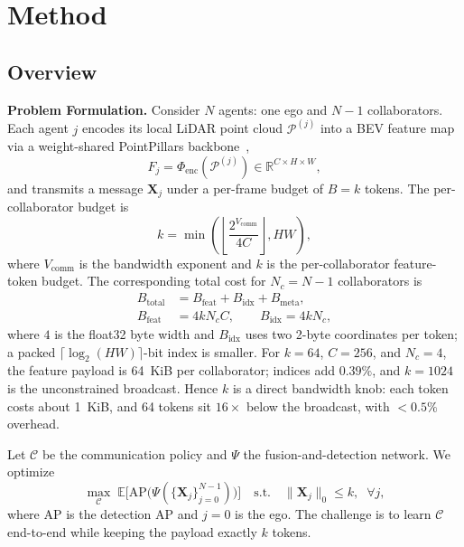 \section{Method}
\label{sec:method}
\subsection{Overview}
\label{subsec:overview}
\noindent\textbf{Problem Formulation.}
Consider $N$ agents: one ego and $N{-}1$ collaborators. Each agent $j$ encodes its local LiDAR point cloud $\mathcal{P}^{(j)}$ into a BEV feature map via a weight-shared PointPillars backbone~\cite{pointpillars},
\begin{equation}
  F_j = \Phi_{\text{enc}}(\mathcal{P}^{(j)}) \in \mathbb{R}^{C\times H\times W},
\end{equation}
and transmits a message $\mathbf{X}_j$ under a per-frame budget of $B{=}k$ tokens. The per-collaborator budget is
\begin{equation}
  k = \min\!\left(\left\lfloor \frac{2^{V_{\text{comm}}}}{4C}\right\rfloor, HW\right),
  \label{eq:budget}
\end{equation}
where $V_{\text{comm}}$ is the bandwidth exponent and $k$ is the per-collaborator feature-token budget. The corresponding total cost for $N_c=N-1$ collaborators is
\begin{equation}
\begin{aligned}
  B_{\text{total}} &= B_{\text{feat}} + B_{\text{idx}} + B_{\text{meta}},\\
  B_{\text{feat}} &= 4 k N_c C,\qquad B_{\text{idx}}=4 k N_c,
\end{aligned}
\label{eq:overhead}
\end{equation}
where $4$ is the float32 byte width and $B_{\text{idx}}$ uses two 2-byte coordinates per token; a packed $\lceil\log_2(HW)\rceil$-bit index is smaller. For $k{=}64$, $C{=}256$, and $N_c{=}4$, the feature payload is 64~KiB per collaborator; indices add $0.39\%$, and $k{=}1024$ is the unconstrained broadcast. Hence $k$ is a direct bandwidth knob: each token costs about 1~KiB, and 64 tokens sit $16\times$ below the broadcast, with $<0.5\%$ overhead.

Let $\mathcal{C}$ be the communication policy and $\Psi$ the fusion-and-detection network. We optimize
\begin{equation}
  \max_{\mathcal{C}} \; \mathbb{E}\big[\mathrm{AP}\big(\Psi(\{\mathbf{X}_j\}_{j=0}^{N-1})\big)\big]
  \quad \text{s.t.} \quad \|\mathbf{X}_j\|_0 \le k,\;\;\forall j,
  \label{eq:problem}
\end{equation}
where $\mathrm{AP}$ is the detection AP and $j{=}0$ is the ego. The challenge is to learn $\mathcal{C}$ end-to-end while keeping the payload exactly $k$ tokens.

